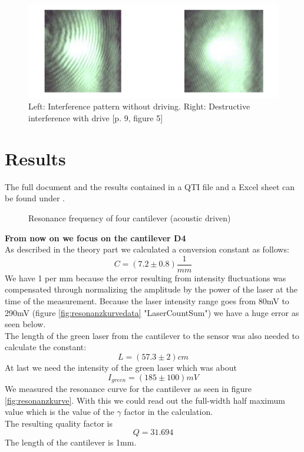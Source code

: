 \documentclass[12pt,a4paper]{article}
\begin{document}
\begin{multicols}{2}
\begin{figure}[H]
	\centering
	\includegraphics[scale=0.6]{../figures/interference.png}
	\caption{Left: Interference pattern without driving. Right: Destructive interference with drive \cite{physikwiki}[p. 9, figure 5]}
	\label{fig:pattern}
\end{figure}
\section{Results}
The full document and the results contained in a QTI file and a Excel sheet can be found under \cite{github}.

\begin{figure}[H]
 \centering
 \caption{Resonance frequency of four cantilever (acoustic driven)}
 \label{tab:acoustic_resonance}
\end{figure}

\noindent
\textbf{From now on we focus on the cantilever D4}\\
As described in the theory part we calculated a conversion constant as follows:
$$C = (7.2 \pm 0.8) \frac{1}{mm}$$
We have 1 per mm because the error resulting from intensity fluctuations was compensated through normalizing the amplitude by the power of the laser at the time of the measurement. Because the laser intensity range goes from 80mV to 290mV (figure \ref{fig:resonanzkurvedata} "LaserCountSum") we have a huge error as seen below.\\
The length of the green laser from the cantilever to the sensor was also needed to calculate the constant:
$$L = (57.3 \pm 2)cm$$
At last we need the intensity of the green laser which was about 
$$I_{green} = (185 \pm 100)mV$$
We measured the resonance curve for the cantilever as seen in figure \ref{fig:resonanzkurve}.
With this we could read out the full-width half maximum value which is the value of the $\gamma$ factor in the calculation.\\
The resulting quality factor is
$$Q = 31.694$$
The length of the cantilever is 1mm.


\end{multicols}
\end{document}
